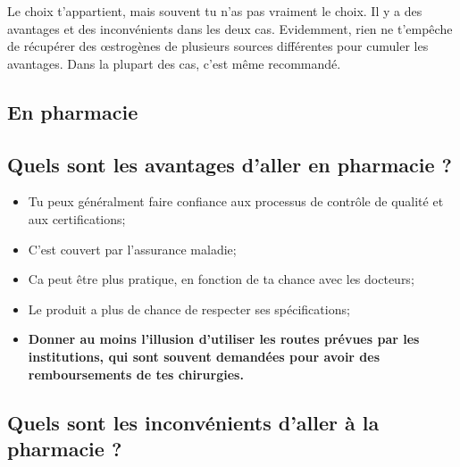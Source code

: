 \documentclass{article}
\begin{document}
Le choix t'appartient, mais souvent tu n'as pas vraiment le choix. Il y a des avantages et des inconvénients dans les deux cas. Evidemment, rien ne t'empêche de récupérer des œstrogènes de plusieurs sources différentes pour cumuler les avantages. Dans la plupart des cas, c'est même recommandé.

\subsection*{En pharmacie}

\subsection{Quels sont les avantages d'aller en pharmacie ?}

\begin{itemize}
  \item Tu peux généralment faire confiance aux processus de contrôle de qualité et aux certifications;
  \item C'est couvert par l'assurance maladie;
  \item Ca peut être plus pratique, en fonction de ta chance avec les docteurs;
  \item Le produit a plus de chance de respecter ses spécifications;
  \item \textbf{Donner au moins l'illusion d'utiliser les routes prévues par les institutions, qui sont souvent demandées pour avoir des remboursements de tes chirurgies.}
\end{itemize}

\subsection{Quels sont les inconvénients d'aller à la pharmacie ?}
\end{document}
